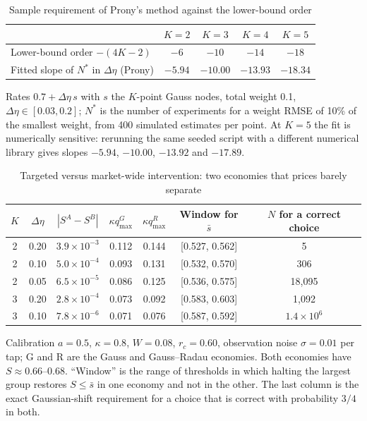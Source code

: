 \documentclass[12pt]{article}
\theoremstyle{definition}
\theoremstyle{remark}
\begin{document}
\begin{table}[!htbp]\centering\small
\begin{threeparttable}
\caption{Sample requirement of Prony's method against the lower-bound order}\label{tab:kupper}
\begin{tabular}{lcccc}
\toprule
 & $K=2$ & $K=3$ & $K=4$ & $K=5$\\
\midrule
Lower-bound order $-(4K-2)$ & $-6$ & $-10$ & $-14$ & $-18$\\
Fitted slope of $N^*$ in $\Delta\eta$ (Prony) & $-5.94$ & $-10.00$ & $-13.93$ & $-18.34$\\
\bottomrule
\end{tabular}
\begin{tablenotes}\footnotesize\item Rates $0.7+\Delta\eta\,s$ with $s$ the $K$-point Gauss nodes, total weight 0.1, $\Delta\eta\in[0.03,0.2]$; $N^*$ is the number of experiments for a weight RMSE of 10\% of the smallest weight, from 400 simulated estimates per point. At $K=5$ the fit is numerically sensitive: rerunning the same seeded script with a different numerical library gives slopes $-5.94$, $-10.00$, $-13.92$ and $-17.89$. \end{tablenotes}
\end{threeparttable}
\end{table}

\begin{table}[!htbp]\centering\footnotesize
\begin{threeparttable}
\caption{Targeted versus market-wide intervention: two economies that prices barely separate}\label{tab:target}
\setlength{\tabcolsep}{3pt}
\begin{tabular}{ccccccc}
\toprule
$K$ & $\Delta\eta$ & $|S^A-S^B|$ & $\kappa q^{G}_{\max}$ & $\kappa q^{R}_{\max}$ & Window for $\bar s$ & $N$ for a correct choice\\
\midrule
2 & 0.20 & $3.9\times10^{-3}$ & 0.112 & 0.144 & [0.527, 0.562] & 5\\
2 & 0.10 & $5.0\times10^{-4}$ & 0.093 & 0.131 & [0.532, 0.570] & 306\\
2 & 0.05 & $6.5\times10^{-5}$ & 0.086 & 0.125 & [0.536, 0.575] & 18{,}095\\
3 & 0.20 & $2.8\times10^{-4}$ & 0.073 & 0.092 & [0.583, 0.603] & 1{,}092\\
3 & 0.10 & $7.8\times10^{-6}$ & 0.071 & 0.076 & [0.587, 0.592] & $1.4\times10^{6}$\\
\bottomrule
\end{tabular}
\begin{tablenotes}\footnotesize\item Calibration $a=0.5$, $\kappa=0.8$, $W=0.08$, $r_c=0.60$, observation noise $\sigma=0.01$ per tap; G and R are the Gauss and Gauss--Radau economies. Both economies have $S\approx0.66$--$0.68$. ``Window'' is the range of thresholds in which halting the largest group restores $S\le\bar s$ in one economy and not in the other. The last column is the exact Gaussian-shift requirement for a choice that is correct with probability $3/4$ in both.\end{tablenotes}
\end{threeparttable}
\end{table}
\clearpage
\end{document}
